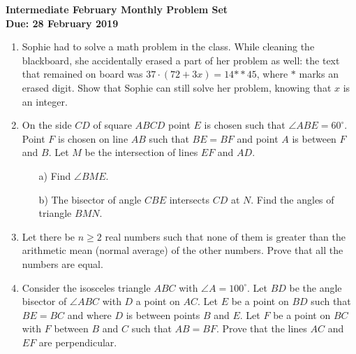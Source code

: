 \documentclass[a4paper,12pt, titlepage]{article}
\begin{document}
\begin{center}
\textbf{\Large Intermediate February Monthly Problem Set}
\\ \vspace{1em}
\textbf{\large Due: 28 February 2019}
\end{center}

\vspace{4pt}

\begin{enumerate}[1.]

\item %

Sophie had to solve a math problem in the class. While cleaning the blackboard, she accidentally erased a part of her problem as well: the text that remained on board was $37\cdot(72+3x)=14{**}45$, where $*$ marks an erased digit. Show that Sophie can still solve her problem, knowing that $x$ is an integer.\\

\item %

On the side $CD$ of square $ABCD$ point $E$ is chosen such that $\angle ABE = 60^{\circ}$. Point $F$ is chosen on line $AB$ such that $BE = BF$ and point $A$ is between $F$ and $B$. Let $M$ be the intersection of lines $EF$ and $AD$.
\begin{itemize}
\item [a)] Find $\angle BME$.
\item [b)] The bisector of angle $CBE$ intersects $CD$ at $N$. Find the angles of triangle $BMN$.\\
\end{itemize}

\item %
Let there be $n \geq 2$ real numbers such that none of them is greater than the arithmetic mean (normal average) of the other numbers. Prove that all the numbers are equal.\\

\item %

Consider the isosceles triangle $ABC$ with $\angle A = 100^{\circ}$. Let $BD$ be the angle bisector of $\angle ABC$ with $D$ a point on $AC$. Let $E$ be a point on $BD$ such that $BE=BC$ and where $D$ is between points $B$ and $E$. Let $F$ be a point on $BC$ with $F$ between $B$ and $C$ such that $AB=BF$. Prove that the lines $AC$ and $EF$ are perpendicular.\\ 


\end{enumerate}
\end{document}
